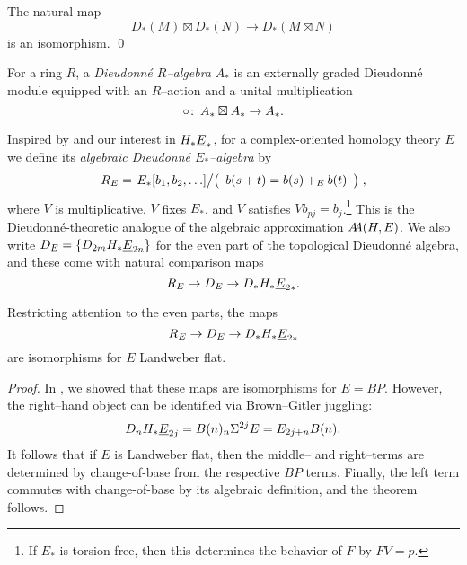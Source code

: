 \begin{lemma}
The natural map \[D_*(M) \boxtimes D_*(N) \to D_*(M \boxtimes N)\] is an isomorphism. \qed
\end{lemma}

\begin{definition}
For a ring \(R\), a \textit{Dieudonn\'e \(R\)--algebra} \(A_*\) is an externally graded Dieudonn\'e module equipped with an \(R\)--action and a unital multiplication \[\circ\co A_* \boxtimes A_* \to A_*.\]
\end{definition}

\begin{example}
Inspired by  and our interest in \(H_* \OS{E}{*}\), for a complex-oriented homology theory \(E\) we define its \textit{algebraic Dieudonn\'e \(E_*\)--algebra} by \[R_E = \left. E_*[b_1, b_2, \ldots] \middle/ \left( \begin{array}{c} b(s+t) = b(s) +_E b(t) \end{array} \right) \right.,\] where \(V\) is multiplicative, \(V\) fixes \(E_*\), and \(V\) satisfies \(Vb_{pj} = b_j\).\footnote{If \(E_*\) is torsion-free, then this determines the behavior of \(F\) by \(FV = p\).}  This is the Dieudonn\'e-theoretic analogue of the algebraic approximation \(\AA(H, E)\).  We also write \(D_E = \{D_{2m} H_* \OS{E}{2n}\}\) for the even part of the topological Dieudonn\'e algebra, and these come with natural comparison maps \[R_E \to D_E \to D_* H_* \OS{E}{2*}.\]
\end{example}

\begin{theorem}\label{LandweberFlatUnstableCoopns}
Restricting attention to the even parts, the maps \[R_E \to D_E \to D_* H_* \OS{E}{2*}\] are isomorphisms for \(E\) Landweber flat.
\end{theorem}
\begin{proof}
In , we showed that these maps are isomorphisms for \(E = BP\).  However, the right--hand object can be identified via Brown--Gitler juggling: \[D_n H_* \OS{E}{2j} = B(n)_n \Susp^{2j} E = E_{2j+n} B(n).\]  It follows that if \(E\) is Landweber flat, then the middle-- and right--terms are determined by change-of-base from the respective \(BP\) terms.  Finally, the left term commutes with change-of-base by its algebraic definition, and the theorem follows.
\end{proof}

